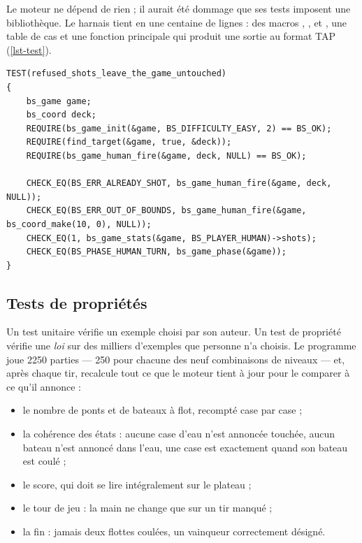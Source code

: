 Le moteur ne dépend de rien ; il aurait été dommage que ses tests imposent une bibliothèque.
Le harnais  tient en une centaine de lignes : des macros
, ,  et , une table de cas et une
fonction principale qui produit une sortie au format TAP (\cref{lst-test}).

\begin{lstlisting}[basicstyle=\ttfamily\footnotesize,
                   caption={Un test unitaire : un tir refusé ne modifie rien (exigence~C4).},
                   label={lst-test}]
TEST(refused_shots_leave_the_game_untouched)
{
    bs_game game;
    bs_coord deck;
    REQUIRE(bs_game_init(&game, BS_DIFFICULTY_EASY, 2) == BS_OK);
    REQUIRE(find_target(&game, true, &deck));
    REQUIRE(bs_game_human_fire(&game, deck, NULL) == BS_OK);

    CHECK_EQ(BS_ERR_ALREADY_SHOT, bs_game_human_fire(&game, deck, NULL));
    CHECK_EQ(BS_ERR_OUT_OF_BOUNDS, bs_game_human_fire(&game, bs_coord_make(10, 0), NULL));
    CHECK_EQ(1, bs_game_stats(&game, BS_PLAYER_HUMAN)->shots);
    CHECK_EQ(BS_PHASE_HUMAN_TURN, bs_game_phase(&game));
}
\end{lstlisting}

\subsection{Tests de propriétés}
\label{sec-proprietes}

Un test unitaire vérifie un exemple choisi par son auteur. Un test de propriété vérifie une
\emph{loi} sur des milliers d'exemples que personne n'a choisis. Le programme
 joue \num{2250} parties --- 250 pour chacune des neuf
combinaisons de niveaux --- et, après chaque tir, recalcule tout ce que le moteur tient à
jour pour le comparer à ce qu'il annonce :

\begin{itemize}
  \item le nombre de ponts et de bateaux à flot, recompté case par case ;
  \item la cohérence des états : aucune case d'eau n'est annoncée touchée, aucun bateau
        n'est annoncé dans l'eau, une case est  exactement quand son bateau est
        coulé ;
  \item le score, qui doit se lire intégralement sur le plateau ;
  \item le tour de jeu : la main ne change que sur un tir manqué ;
  \item la fin : jamais deux flottes coulées, un vainqueur correctement désigné.
\end{itemize}

